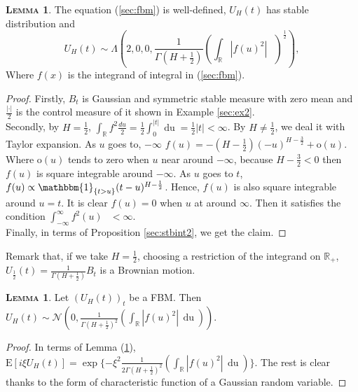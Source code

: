 \documentclass[a4paper, twoside, 11pt]{article}
\theoremstyle{definition}
\newtheorem{lemma}[definition]{\scshape Lemma}
\begin{document}
\begin{lemma}
  The equation (\ref{sec:fbm}) is well-defined, $U_H(t)$ has stable distribution and 
  \begin{equation*}
	U_H(t) \sim \Lambda(2, 0, 0, \frac{1}{\Gamma(H+\frac{1}{2})}(\int_{\mathbb{R}} |f(u)^2|\, \mathop{\frac{du}{2}})^\frac{1}{2}),
  \end{equation*}
  Where $f(x)$ is the integrand of integral in (\ref{sec:fbm}).
  \label{sec:l2}
\end{lemma}
\begin{proof}
  Firstly, $B_t$ is Gaussian and symmetric stable measure with zero mean and $\frac{|\cdot|}{2}$ is the control measure of it shown in Example \ref{sec:ex2}. \\
  Secondly, by $H=\frac{1}{2}$, $\int_{\mathbb{R}} f^2\frac{du}{2} = \frac{1}{2}\int_{0}^{|t|} \mathop{du} = \frac{1}{2}|t| < \infty$. By $H \neq \frac{1}{2}$, we deal it with Taylor expansion. As $u$ goes to, $-\infty$ $f(u) = -(H-\frac{1}{2})(-u)^{H-\frac{3}{2}} + \mathrm{o}(u)$. Where $\mathrm{o}(u)$ tends to zero when $u$ near around $-\infty$, because $H-\frac{3}{2} < 0$ then $f(u)$ is square integrable around $-\infty$. As $u$ goes to $t$, $f(u) \propto \mathbbm{1}_{\{t > u\}}(t-u)^{H-\frac{1}{2}}$. Hence, $f(u)$ is also square integrable around $u=t$. It is clear $f(u)=0$ when $u$ at around $\infty$. Then it satisfies the condition $\int_{-\infty}^{\infty}f^2(u)\,\mathop{\frac{du}{2}} < \infty$.\\
  Finally, in terms of Proposition \ref{sec:stbint2}, we get the claim.
\end{proof}
Remark that, if we take $H=\frac{1}{2}$, choosing a restriction of the integrand on $\mathbb{R}_+$, $U_{\frac{1}{2}}(t) = \frac{1}{\Gamma(H+\frac{1}{2})} B_t$ is a Brownian motion. 	
\begin{lemma}
  Let $(U_H(t))_t$ be a FBM. Then $U_H(t) \sim \mathcal{N}(0, \frac{1}{\Gamma(H+\frac{1}{2})^2}(\int_{\mathbb{R}} |f(u)^2|\, \mathop{du}))$.
  \label{sec:the1}
\end{lemma}
\begin{proof}
  In terms of Lemma (\ref{sec:l2}), $\mathrm{E}[i\xi U_H(t)] = \exp\{-\xi^2 \frac{1}{2\Gamma(H+\frac{1}{2})^2}(\int_{\mathbb{R}} |f(u)^2|\, \mathop{du})\}$. The rest is clear thanks to the form of characteristic function of a Gaussian random variable.
\end{proof}
\end{document}
